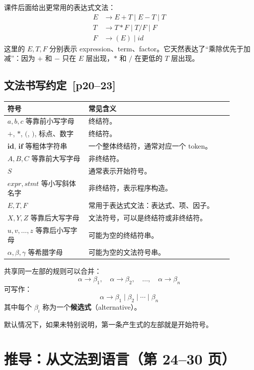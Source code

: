 \documentclass[UTF8,fontset=none,11pt]{ctexart}
\newcommand{\pg}[1]{\texorpdfstring{{\small\color{graytext}\,[p#1]}}{ [p#1]}}
\newcommand{\term}[2]{\textbf{#1}（#2）}
\begin{document}
课件后面给出更常用的表达式文法：
\[
\begin{aligned}
E &\to E+T \mid E-T \mid T\\
T &\to T*F \mid T/F \mid F\\
F &\to (E)\mid id
\end{aligned}
\]
这里的 \(E,T,F\) 分别表示 expression、term、factor。它天然表达了“乘除优先于加减”：因为 \(+\) 和 \(-\) 只在 \(E\) 层出现，\(*\) 和 \(/\) 在更低的 \(T\) 层出现。

\subsection{文法书写约定 \pg{20--23}}
\begin{longtable}{p{0.32\linewidth}p{0.58\linewidth}}
\toprule
\textbf{符号} & \textbf{常见含义} \\
\midrule
\(a,b,c\) 等靠前小写字母 & 终结符。\\
\(+\), \(*\), \((\), \()\), 标点、数字 & 终结符。\\
\(\mathbf{id}\), \(\mathbf{if}\) 等粗体字符串 & 一个整体终结符，通常对应一个 token。\\
\(A,B,C\) 等靠前大写字母 & 非终结符。\\
\(S\) & 通常表示开始符号。\\
\(expr,stmt\) 等小写斜体名字 & 非终结符，表示程序构造。\\
\(E,T,F\) & 常用于表达式文法：表达式、项、因子。\\
\(X,Y,Z\) 等靠后大写字母 & 文法符号，可以是终结符或非终结符。\\
\(u,v,\ldots,z\) 等靠后小写字母 & 可能为空的终结符串。\\
\(\alpha,\beta,\gamma\) 等希腊字母 & 可能为空的文法符号串。\\
\bottomrule
\end{longtable}

共享同一左部的规则可以合并：
\[
\alpha\to\beta_1,\quad \alpha\to\beta_2,\quad\ldots,\quad\alpha\to\beta_n
\]
可写作：
\[
\alpha\to\beta_1\mid\beta_2\mid\cdots\mid\beta_n
\]
其中每个 \(\beta_i\) 称为一个\term{候选式}{alternative}。

默认情况下，如果未特别说明，第一条产生式的左部就是开始符号。

\section{推导：从文法到语言（第 24--30 页）}
\end{document}
